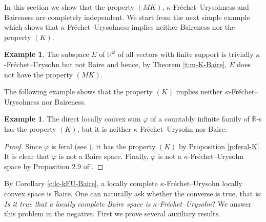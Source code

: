 \documentclass[preprint,11pt]{elsarticle}
\theoremstyle{definition}
\newtheorem{example}[theorem]{Example}
\theoremstyle{remark}
\numberwithin{equation}{section}
\numberwithin{theorem}{section}
\newcommand{\w}{\omega}
\newcommand{\IR}{\mathbb{R}}
\begin{document}




In this section we show that the property $(MK)$, $\kappa$-Fr\'{e}chet--Urysohness and Baireness are completely independent. We start from the next simple example which shows that $\kappa$-Fr\'{e}chet--Urysohness implies neither Baireness nor the property $(K)$.

\begin{example} \label{exa:metr-not-K-Baire}
The subspace $E$ of $\IR^\w$ of all vectors with finite support is trivially $\kappa$-Fr\'{e}chet--Urysohn but not Baire and hence, by Theorem \ref{t:m-K-Baire}, $E$ does not have the property $(MK)$.
\end{example}

The following example shows that the property $(K)$ implies neither $\kappa$-Fr\'{e}chet--Urysohness nor  Baireness.

\begin{example} \label{exa:K-not-Baire-kFU}
The direct locally convex sum $\varphi$ of a countably infinite family of $\IR$-s has the property $(K)$, but it is  neither $\kappa$-Fr\'{e}chet--Urysohn nor  Baire.
\end{example}

\begin{proof}
Since $\varphi$ is feral (see \cite[Proposition~4.3.4]{Jar}), it has the property $(K)$ by Proposition \ref{p:feral-K}. It is clear that $\varphi$ is not a Baire space. Finally, $\varphi$ is not a  $\kappa$-Fr\'{e}chet--Urysohn space by Proposition 2.9 of \cite{Gabr-B1}.
\end{proof}





By Corollary \ref{c:lc-kFU-Baire}, a locally complete $\kappa$-Fr\'{e}chet--Urysohn locally convex space is Baire. One can naturally ask whether the converse is true, that is: {\em Is it true that a locally complete Baire space is $\kappa$-Fr\'{e}chet--Urysohn}? We answer this problem in the negative. First we prove several auxiliary results.
\end{document}
